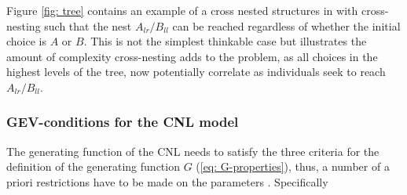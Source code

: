 Figure \ref{fig: tree} contains an example of a cross nested structures in with cross-nesting such that the nest $A_{lr}/B_{ll}$ can be reached regardless of whether the initial choice is $A$ or $B$. This is not the simplest thinkable case but illustrates the amount of complexity cross-nesting adds to the problem, as all choices in the highest levels of the tree, now potentially correlate as individuals seek to reach $A_{lr}/B_{ll}$.




\subsubsection{GEV-conditions for the CNL model} \label{sec: GEV-conditions}
The generating function of the CNL needs to satisfy the three criteria for the definition of the generating function $G$ (\ref{eq: G-properties}), thus, a number of a priori restrictions have to be made on the parameters \citep{bierlaire_theoretical_2006}. Specifically
